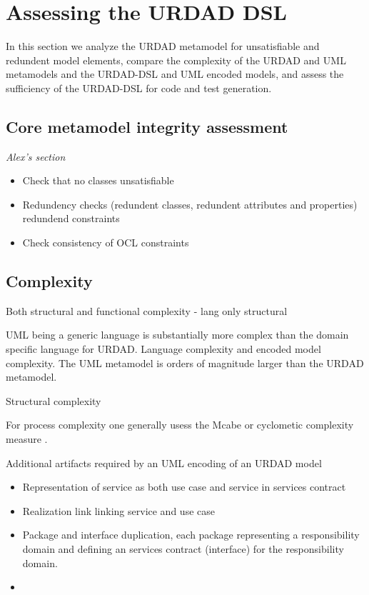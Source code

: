 \section{Assessing the URDAD DSL \label{sec:assessment}}

In this section we analyze the URDAD metamodel for unsatisfiable and redundent model elements, compare the complexity of the URDAD and UML metamodels and the URDAD-DSL and UML encoded models, and assess the sufficiency of the URDAD-DSL for code and test generation.


\subsection{Core metamodel integrity assessment}

\emph{Alex's section}


\begin{itemize}
  \item Check that no classes unsatisfiable
  \item Redundency checks (redundent classes, redundent attributes and properties) redundend constraints
  \item Check consistency of OCL constraints
\end{itemize}


\subsection{Complexity}

Both structural and functional complexity - lang only structural

UML being a generic language is substantially more complex than the domain specific language for URDAD.
Language complexity and encoded model complexity. The UML metamodel is orders of magnitude larger than the URDAD metamodel. 


Structural complexity

For process complexity one generally usess the Mcabe or cyclometic complexity measure \cite{mccabe_complexity_1976}.

Additional artifacts required by an UML encoding of an URDAD model
\begin{itemize}
  \item Representation of service as both use case and service in services contract
  \item Realization link linking service and use case
  \item Package and interface duplication, each package representing a responsibility domain and defining an services contract (interface) for the responsibility domain.
  \item
\end{itemize}


